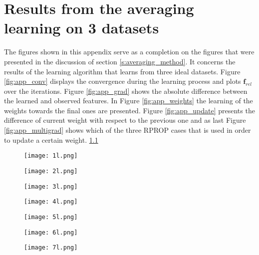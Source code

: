\chapter{Results from the averaging learning on 3 datasets}
\label{app:C}
The figures shown in this appendix serve as a completion on the figures that were presented in the discussion of section \ref{s:averaging_method}. It concerns the results of the learning algorithm that learns from three ideal datasets. Figure \ref{fig:app_conv} displays the convergence during the learning process and plots $\bm{f}_{rel}$ over the iterations. Figure \ref{fig:app_grad} shows the absolute difference between the learned and observed features. In Figure \ref{fig:app_weights} the learning of the weights towards the final ones are presented. Figure \ref{fig:app_update} presents the difference of current weight with respect to the previous one and as last Figure \ref{fig:app_multigrad} shows which of the three RPROP cases that is used in order to update a certain weight. \ref{stijn}

\begin{figure}[h!]\label{stijn}
	\centering
	\texttt{[image: 1l.png]}
	\caption{}	
\end{figure}


\begin{figure}[h!]
	\centering
	\texttt{[image: 2l.png]}
	\label{fig:lat_acc_val}
\end{figure}

\begin{figure}[h!]
	\centering
	\texttt{[image: 3l.png]}
	\label{fig:lat_acc_val}
\end{figure}


\begin{figure}[h!]
	\centering
	\texttt{[image: 4l.png]}
	\label{fig:lat_acc_val}
\end{figure}


\begin{figure}[h!]
	\centering
	\texttt{[image: 5l.png]}
	\label{fig:lat_acc_val}
\end{figure}


\begin{figure}[h!]
	\centering
	\texttt{[image: 6l.png]}
	\label{fig:lat_acc_val}
\end{figure}


\begin{figure}[h!]
	\centering
	\texttt{[image: 7l.png]}
	\label{fig:lat_acc_val}
\end{figure}


